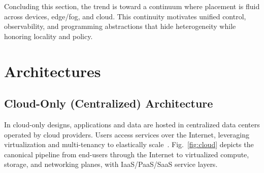 \documentclass[conference]{IEEEtran}
\begin{document}
Concluding this section, the trend is toward a continuum where placement is fluid across devices, edge/fog, and cloud. This continuity motivates unified control, observability, and programming abstractions that hide heterogeneity while honoring locality and policy.

\section{Architectures}\label{sec:arch}
\subsection{Cloud-Only (Centralized) Architecture}
In cloud-only designs, applications and data are hosted in centralized data centers operated by cloud providers. Users access services over the Internet, leveraging virtualization and multi-tenancy to elastically scale~\cite{Armbrust2010CACM}. Fig.~\ref{fig:cloud} depicts the canonical pipeline from end-users through the Internet to virtualized compute, storage, and networking planes, with IaaS/PaaS/SaaS service layers.
\end{document}
